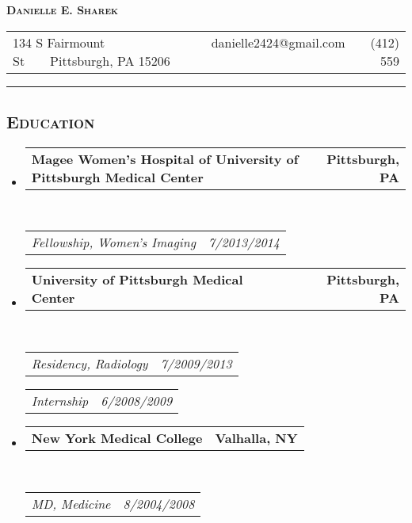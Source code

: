 \documentclass[12pt,letterpaper,oneside]{article}
\makeatletter
\newcommand{\headerrow}[2]
{\begin{tabular*}{\linewidth}{l@{\extracolsep{\fill}}r}
	#1 &
	#2 \\
\end{tabular*}}
\makeatother
\begin{document}
\begin{center}
{\LARGE \textbf{\textsc{Danielle E. Sharek}}}
\vspace{4mm}

\headerrow
	{134 S Fairmount St\ \ \textbullet \ \ Pittsburgh, PA 15206}
	{danielle2424@gmail.com\ \ \textbullet \ \ (412) 559\textendash 8747}	
\end{center}
\vspace{-2mm}

\hrule
\vspace{-0.4em}
\subsection*{\centering\textsc{Education}}

\begin{itemize}
	\parskip=0.1em

	\item 
	\headerrow
		{\textbf{Magee Women's Hospital of University of Pittsburgh Medical Center}}
		{\textbf{Pittsburgh, PA}}
	\\
	\headerrow
		{\emph{Fellowship, Women's Imaging}}
		{\emph{7/2013\textendash 6/2014}}
	\vspace{-6mm}		
\end{itemize}

\begin{itemize}
	\parskip=0.1em

	\item 
	\headerrow
		{\textbf{University of Pittsburgh Medical Center}}
		{\textbf{Pittsburgh, PA}}
	\\
	\headerrow
		{\emph{Residency, Radiology}}
		{\emph{7/2009\textendash 6/2013}}
	\headerrow
		{\emph{Internship}}
		{\emph{6/2008\textendash 6/2009}}
	\vspace{-6mm}		
\end{itemize}

\begin{itemize}
	\parskip=0.1em

	\item 
	\headerrow
		{\textbf{New York Medical College}}
		{\textbf{Valhalla, NY}}
	\\
	\headerrow
		{\emph{MD, Medicine}}
		{\emph{8/2004\textendash 5/2008}}
	\vspace{-6mm}		
\end{itemize}
\end{document}

